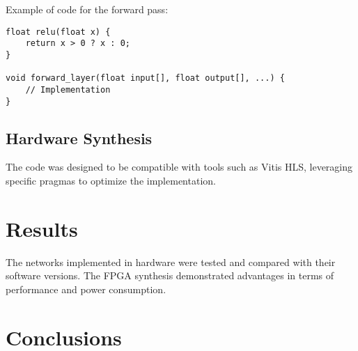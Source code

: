 \documentclass{article}
\begin{document}
Example of code for the forward pass:
\begin{lstlisting}
float relu(float x) {
    return x > 0 ? x : 0;
}

void forward_layer(float input[], float output[], ...) {
    // Implementation
}
\end{lstlisting}

\subsection{Hardware Synthesis}
The code was designed to be compatible with tools such as Vitis HLS, leveraging specific pragmas to optimize the implementation.

\section{Results}
The networks implemented in hardware were tested and compared with their software versions. The FPGA synthesis demonstrated advantages in terms of performance and power consumption.

\section{Conclusions}
\end{document}
